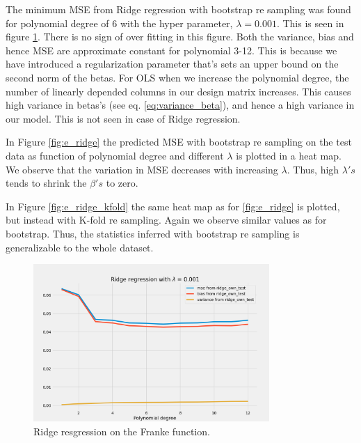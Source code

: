 
The minimum MSE from Ridge regression with bootstrap re sampling was found for polynomial degree of 6 with
the hyper parameter, $\lambda = 0.001$. This is seen in figure
\ref{fig:ridge_blabla}. There is no sign of over fitting in this figure. Both
the variance, bias and hence MSE are approximate constant for polynomial 3-12.
This is because we have introduced a regularization parameter that's sets an
upper bound on the second norm of the betas. For OLS when we increase the
polynomial degree, the number of linearly depended columns in our design matrix
increases. This causes high variance in betas's (see eq.
\ref{eq:variance_beta}), and hence a high variance in our model.  
This is not seen in case of Ridge regression.      

In Figure \ref{fig:e_ridge} the predicted MSE with bootstrap re sampling on the test data as function of
polynomial degree and different $\lambda $ is plotted in a heat map. We observe
that the variation in MSE decreases with increasing $\lambda $. Thus, high
$\lambda 's$ tends to shrink the $\beta's $ to zero.  

In Figure \ref{fig:e_ridge_kfold} the same heat map as for \ref{fig:e_ridge} is
plotted, but instead with K-fold re sampling. Again we observe similar values
as for bootstrap. Thus, the statistics inferred with bootstrap re sampling is
generalizable to the whole dataset. 




\begin{figure}[H]
    \centering
    \caption{Ridge resgression on the Franke function.}
    \label{fig:ridge_blabla}
    \includegraphics[width=0.8\textwidth]{Figures/e_ridge_bias_variance_lamb_0_001.png}
\end{figure}



